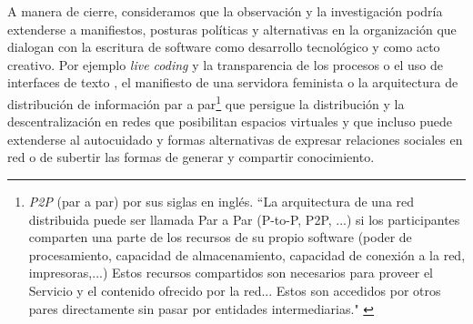
A manera de cierre, consideramos que la observación y la investigación podría extenderse a manifiestos, posturas políticas y alternativas en la organización que dialogan con la escritura de software como desarrollo tecnológico y como acto creativo. Por ejemplo \textit{live coding} y la transparencia de los procesos o el uso de interfaces de texto \citep{collinsLivecoding}, el manifiesto de una servidora feminista \citep{feministserver} o la arquitectura de distribución de información par a par\footnote{\textit{P2P} (par a par) por sus siglas en inglés.  ``La arquitectura de una red distribuida puede ser llamada Par a Par (P-to-P, P2P, ...)   si los participantes comparten una parte de los recursos de su propio software (poder de procesamiento, capacidad de almacenamiento, capacidad de conexión a la red, impresoras,...) Estos recursos compartidos son necesarios para proveer el Servicio y el contenido ofrecido por la red... Estos son accedidos por otros pares directamente sin pasar por entidades intermediarias." \citep{p2p}} que persigue la distribución y la descentralización en redes que posibilitan espacios virtuales \citep{cyberspace} y que incluso puede extenderse al autocuidado y formas alternativas de expresar relaciones sociales en red \citep{dwc} o de subertir las formas de generar y compartir conocimiento.

\color{black}
